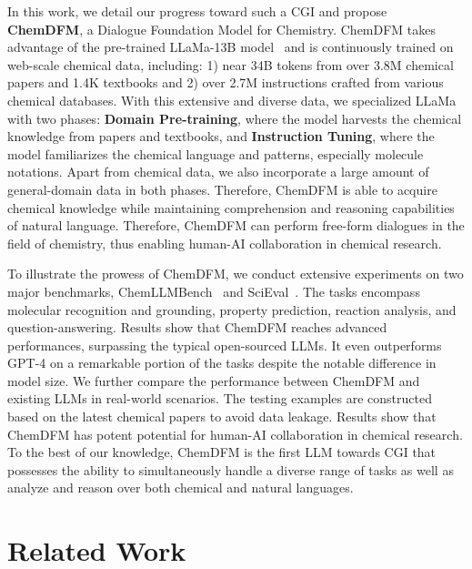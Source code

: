 In this work, we detail our progress toward such a CGI and propose \textbf{ChemDFM}, a Dialogue Foundation Model for Chemistry.
ChemDFM takes advantage of the pre-trained LLaMa-13B model~\cite{touvron2023llama} and is continuously trained on web-scale chemical data, including: 1) near 34B tokens from over 3.8M chemical papers and 1.4K textbooks and 2) over 2.7M instructions crafted from various chemical databases. With this extensive and diverse data, we specialized LLaMa with two phases: \textbf{Domain Pre-training}, where the model harvests the chemical knowledge from papers and textbooks, and \textbf{Instruction Tuning}, where the model familiarizes the chemical language and patterns, especially molecule notations. Apart from chemical data, we also incorporate a large amount of general-domain data in both phases. Therefore, ChemDFM is able to acquire chemical knowledge while maintaining comprehension and reasoning capabilities of natural language. Therefore, ChemDFM can perform free-form dialogues in the field of chemistry, thus enabling human-AI collaboration in chemical research.

To illustrate the prowess of ChemDFM, we conduct extensive experiments on two major benchmarks, ChemLLMBench~\cite{guo2023large} and SciEval~\cite{sun2023scieval}. The tasks encompass molecular recognition and grounding, property prediction, reaction analysis, and question-answering. 
Results show that ChemDFM reaches advanced performances, surpassing the typical open-sourced LLMs. It even outperforms GPT-4 on a remarkable portion of the tasks despite the notable difference in model size.
We further compare the performance between ChemDFM and existing LLMs in real-world scenarios. The testing examples are constructed based on the latest chemical papers to avoid data leakage. Results show
that ChemDFM has potent potential for human-AI collaboration in chemical research.
To the best of our knowledge, ChemDFM is the first LLM towards
CGI that possesses
the ability to simultaneously handle a diverse range of tasks as well as
analyze and reason over both chemical and natural languages.

\section{Related Work}


